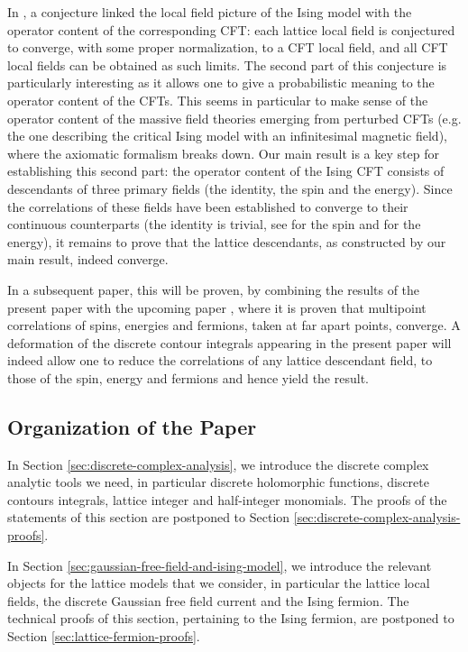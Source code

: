 \documentclass[12pt,oneside,english]{amsart}
\numberwithin{equation}{section}
\numberwithin{figure}{section}
\theoremstyle{plain}
\theoremstyle{plain}
\theoremstyle{plain}
\theoremstyle{plain}
\theoremstyle{remark}
\theoremstyle{definition}
\theoremstyle{plain}
\theoremstyle{plain}
\numberwithin{thm}{section}
\begin{document}
In \cite{gheissari-hongler-park}, a conjecture linked the local field
picture of the Ising model with the operator content of the corresponding
CFT: each lattice local field is conjectured to converge, with some
proper normalization, to a CFT local field, and all CFT local fields
can be obtained as such limits. The second part of this conjecture
is particularly interesting as it allows one to give a probabilistic
meaning to the operator content of the CFTs. This seems in particular
to make sense of the operator content of the massive field theories
emerging from perturbed CFTs (e.g. the one describing the critical
Ising model with an infinitesimal magnetic field), where the axiomatic
formalism breaks down. Our main result is a key step for establishing
this second part: the operator content of the Ising CFT consists of
descendants of three primary fields (the identity, the spin and the
energy). Since the correlations of these fields have been established
to converge to their continuous counterparts (the identity is trivial,
see \cite{chelkak-hongler-izyurov} for the spin and \cite{hongler}
for the energy), it remains to prove that the lattice descendants,
as constructed by our main result, indeed converge.

In a subsequent paper, this will be proven, by combining the results
of the present paper with the upcoming paper \cite{chelkak-hongler-izyurov-ii},
where it is proven that multipoint correlations of spins, energies
and fermions, taken at far apart points, converge. A deformation of
the discrete contour integrals appearing in the present paper will
indeed allow one to reduce the correlations of any lattice descendant
field, to those of the spin, energy and fermions and hence yield the
result.

\subsection{Organization of the Paper}

In Section \ref{sec:discrete-complex-analysis}, we introduce the
discrete complex analytic tools we need, in particular discrete holomorphic
functions, discrete contours integrals, lattice integer and half-integer
monomials. The proofs of the statements of this section are postponed
to Section \ref{sec:discrete-complex-analysis-proofs}.

In Section \ref{sec:gaussian-free-field-and-ising-model}, we introduce
the relevant objects for the lattice models that we consider, in particular
the lattice local fields, the discrete Gaussian free field current
and the Ising fermion. The technical proofs of this section, pertaining
to the Ising fermion, are postponed to Section \ref{sec:lattice-fermion-proofs}.
\end{document}
